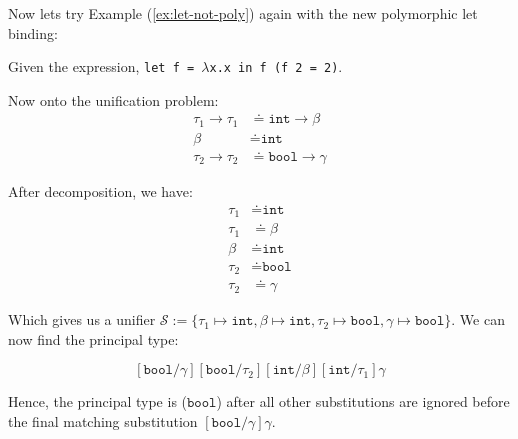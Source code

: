 \noindent
Now lets try Example (\ref{ex:let-not-poly}) again with the new polymorphic let binding:
\begin{Example}

    \noindent
    Given the expression, \texttt{let f = $\lambda$x.x in f (f\ 2 = 2)}.

    \vspace{1em}
\Large
{}
\normalsize

\vspace{1em}
  
\noindent
Now onto the unification problem:
\begin{align*}
    \tau_1\to\tau_1 &\doteq \texttt{int}\to\beta\\
    \beta &\doteq \texttt{int}\\
    \tau_2\to\tau_2 &\doteq \texttt{bool}\to\gamma
\end{align*}

\noindent
After decomposition, we have:
\begin{align*}
    \tau_1&\doteq\texttt{int}\\
    \tau_1 &\doteq \beta\\
    \beta &\doteq \texttt{int}\\
    \tau_2&\doteq\texttt{bool}\\
    \tau_2 &\doteq \gamma
\end{align*}

\noindent
Which gives us a unifier $\mathcal{S}:=\{\tau_1\mapsto\texttt{int},\beta\mapsto\texttt{int},\tau_2\mapsto\texttt{bool},\gamma\mapsto\texttt{bool}\}$. We can now find the principal type:

\[
[\texttt{bool}/\gamma][\texttt{bool}/\tau_2][\texttt{int}/\beta][\texttt{int}/\tau_1]\gamma
\]

\noindent
Hence, the principal type is ($\texttt{bool}$) after all other substitutions are ignored before the final matching substitution
$[\texttt{bool}/\gamma]\gamma$.
\end{Example}